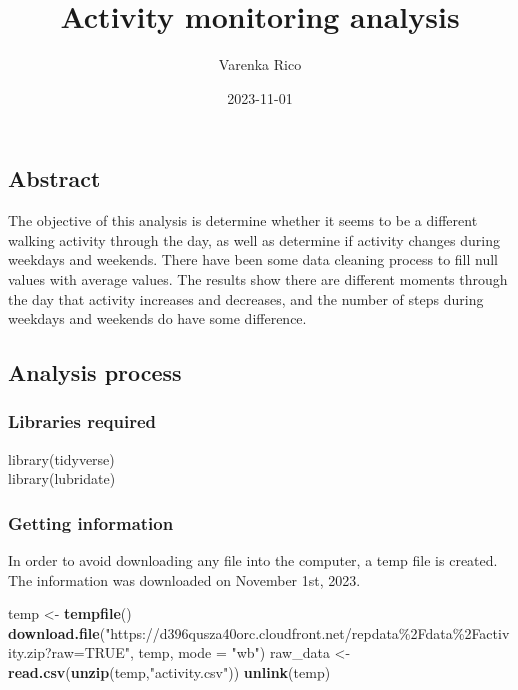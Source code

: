 \documentclass[
]{article}
\title{Activity monitoring analysis}
\author{Varenka Rico}
\date{2023-11-01}
\newenvironment{Shaded}{\begin{snugshade}}{\end{snugshade}}
\newcommand{\AttributeTok}[1]{\textcolor[rgb]{0.13,0.29,0.53}{#1}}
\newcommand{\FunctionTok}[1]{\textcolor[rgb]{0.13,0.29,0.53}{\textbf{#1}}}
\newcommand{\NormalTok}[1]{#1}
\newcommand{\OtherTok}[1]{\textcolor[rgb]{0.56,0.35,0.01}{#1}}
\newcommand{\StringTok}[1]{\textcolor[rgb]{0.31,0.60,0.02}{#1}}
\begin{document}
\maketitle

\hypertarget{abstract}{%
\subsection{Abstract}\label{abstract}}

The objective of this analysis is determine whether it seems to be a
different walking activity through the day, as well as determine if
activity changes during weekdays and weekends. There have been some data
cleaning process to fill null values with average values. The results
show there are different moments through the day that activity increases
and decreases, and the number of steps during weekdays and weekends do
have some difference.

\hypertarget{analysis-process}{%
\subsection{Analysis process}\label{analysis-process}}

\hypertarget{libraries-required}{%
\subsubsection{Libraries required}\label{libraries-required}}

library(tidyverse)\\
library(lubridate)

\hypertarget{getting-information}{%
\subsubsection{Getting information}\label{getting-information}}

In order to avoid downloading any file into the computer, a temp file is
created. The information was downloaded on November 1st, 2023.

\begin{Shaded}
\begin{Highlighting}[]
\NormalTok{temp }\OtherTok{\textless{}{-}} \FunctionTok{tempfile}\NormalTok{()}
\FunctionTok{download.file}\NormalTok{(}\StringTok{"https://d396qusza40orc.cloudfront.net/repdata\%2Fdata\%2Factivity.zip?raw=TRUE"}\NormalTok{, }
\NormalTok{              temp, }\AttributeTok{mode =} \StringTok{"wb"}\NormalTok{)}
\NormalTok{raw\_data }\OtherTok{\textless{}{-}}\FunctionTok{read.csv}\NormalTok{(}\FunctionTok{unzip}\NormalTok{(temp,}\StringTok{"activity.csv"}\NormalTok{))}
\FunctionTok{unlink}\NormalTok{(temp)}
\end{Highlighting}
\end{Shaded}
\end{document}
